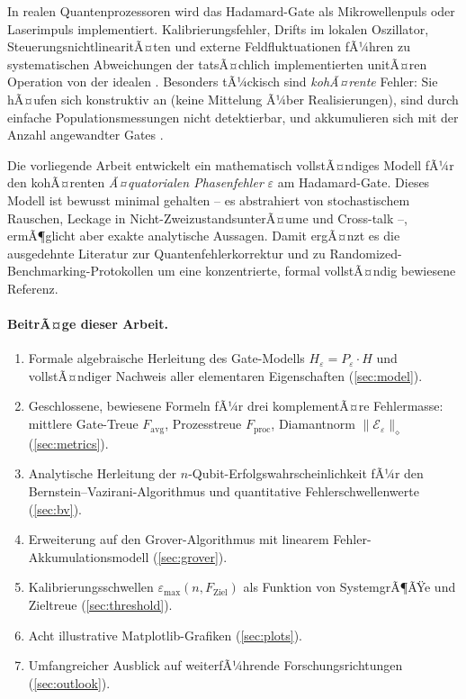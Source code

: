 ﻿\documentclass[11pt,a4paper]{article}
\theoremstyle{definition}
\newcommand{\eps}{\varepsilon}
\newcommand{\Heps}{H_{\!\varepsilon}}
\newcommand{\Pe}{P_{\varepsilon}}
\newcommand{\Fav}{F_{\!\mathrm{avg}}}
\newcommand{\Fdiam}{\|\mathcal{E}_\eps\|_\diamond}
\begin{document}
In realen Quantenprozessoren wird das Hadamard-Gate als Mikrowellenpuls oder
Laserimpuls implementiert.  Kalibrierungsfehler, Drifts im lokalen Oszillator,
SteuerungsnichtlinearitÃ¤ten und externe Feldfluktuationen fÃ¼hren zu systematischen
Abweichungen der tatsÃ¤chlich implementierten unitÃ¤ren Operation von der
idealen \cite{Rol2019,Sheldon2016}.  Besonders tÃ¼ckisch sind \emph{kohÃ¤rente}
Fehler: Sie hÃ¤ufen sich konstruktiv an (keine Mittelung Ã¼ber Realisierungen),
sind durch einfache Populationsmessungen nicht detektierbar, und akkumulieren
sich mit der Anzahl angewandter Gates \cite{Emerson2007}.

Die vorliegende Arbeit entwickelt ein mathematisch vollstÃ¤ndiges Modell
fÃ¼r den kohÃ¤renten \emph{Ã¤quatorialen Phasenfehler} $\eps$ am Hadamard-Gate.
Dieses Modell ist bewusst minimal gehalten -- es abstrahiert von stochastischem
Rauschen, Leckage in Nicht-ZweizustandsunterÃ¤ume und Cross-talk --,
ermÃ¶glicht aber exakte analytische Aussagen.  Damit ergÃ¤nzt es die ausgedehnte
Literatur zur Quantenfehlerkorrektur \cite{Gottesman1997,Shor1995,Steane1996}
und zu Randomized-Benchmarking-Protokollen \cite{Magesan2011,Knill2008}
um eine konzentrierte, formal vollstÃ¤ndig bewiesene Referenz.

\paragraph{BeitrÃ¤ge dieser Arbeit.}
\begin{enumerate}[label=(\roman*)]
  \item Formale algebraische Herleitung des Gate-Modells $\Heps = \Pe \cdot H$
        und vollstÃ¤ndiger Nachweis aller elementaren Eigenschaften
        (\cref{sec:model}).
  \item Geschlossene, bewiesene Formeln fÃ¼r drei komplementÃ¤re Fehlermasse:
        mittlere Gate-Treue $\Fav$, Prozesstreue $F_{\mathrm{proc}}$,
        Diamantnorm $\Fdiam$ (\cref{sec:metrics}).
  \item Analytische Herleitung der $n$-Qubit-Erfolgswahrscheinlichkeit fÃ¼r
        den Bernstein--Vazirani-Algorithmus und quantitative
        Fehlerschwellenwerte (\cref{sec:bv}).
  \item Erweiterung auf den Grover-Algorithmus mit linearem
        Fehler-Akkumulationsmodell (\cref{sec:grover}).
  \item Kalibrierungsschwellen $\eps_{\max}(n, F_{\mathrm{Ziel}})$
        als Funktion von SystemgrÃ¶ÃŸe und Zieltreue (\cref{sec:threshold}).
  \item Acht illustrative Matplotlib-Grafiken (\cref{sec:plots}).
  \item Umfangreicher Ausblick auf weiterfÃ¼hrende Forschungsrichtungen
        (\cref{sec:outlook}).
\end{enumerate}
\end{document}

